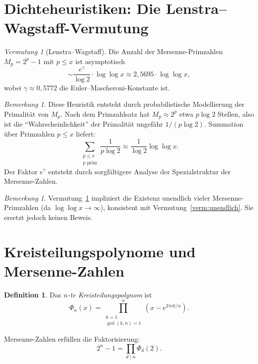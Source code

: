 \documentclass[12pt,a4paper]{amsart}
\theoremstyle{definition}
\newtheorem{definition_de}[theorem]{Definition}
\theoremstyle{remark}
\newtheorem{bemerkung}[theorem]{Bemerkung}
\newtheorem{vermutung}[theorem]{Vermutung}
\begin{document}
\section{Dichteheuristiken: Die Lenstra--Wagstaff-Vermutung}

\begin{vermutung}[Lenstra--Wagstaff]
\label{verm:LW}
Die Anzahl der Mersenne-Primzahlen $M_p = 2^p - 1$ mit $p \leq x$ ist
asymptotisch
\[
  \sim \frac{e^\gamma}{\log 2} \cdot \log\log x
  \approx 2{,}5695 \cdot \log\log x,
\]
wobei $\gamma \approx 0{,}5772$ die Euler--Mascheroni-Konstante ist.
\end{vermutung}

\begin{bemerkung}
Diese Heuristik entsteht durch probabilistische Modellierung der Primalität
von $M_p$.
Nach dem Primzahlsatz hat $M_p \approx 2^p$ etwa $p \log 2$ Stellen, also ist
die ``Wahrscheinlichkeit'' der Primalität ungefähr $1/(p \log 2)$.
Summation über Primzahlen $p \leq x$ liefert:
\[
  \sum_{\substack{p \leq x \\ p \text{ prim}}} \frac{1}{p \log 2}
  \approx \frac{1}{\log 2} \log\log x.
\]
Der Faktor $e^\gamma$ entsteht durch sorgfältigere Analyse der Spezialstruktur
der Mersenne-Zahlen.
\end{bemerkung}

\begin{bemerkung}
Vermutung~\ref{verm:LW} impliziert die Existenz unendlich vieler Mersenne-Primzahlen
(da $\log\log x \to \infty$), konsistent mit Vermutung~\ref{verm:unendlich}.
Sie ersetzt jedoch keinen Beweis.
\end{bemerkung}

\section{Kreisteilungspolynome und Mersenne-Zahlen}

\begin{definition_de}
Das \emph{$n$-te Kreisteilungspolynom} ist
\[
  \Phi_n(x) = \prod_{\substack{k=1 \\ \gcd(k,n)=1}}^n (x - e^{2\pi i k/n}).
\]
\end{definition_de}

Mersenne-Zahlen erfüllen die Faktorisierung:
\[
  2^n - 1 = \prod_{d \mid n} \Phi_d(2).
\]
\end{document}
